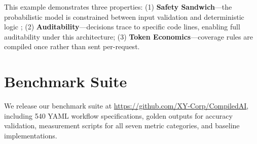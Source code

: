 \documentclass[11pt]{article}
\begin{document}
This example demonstrates three properties: (1) \textbf{Safety Sandwich}---the probabilistic model is constrained between input validation and deterministic logic \citep{dalrymple2024guaranteed}; (2) \textbf{Auditability}---decisions trace to specific code lines, enabling full auditability under this architecture; (3) \textbf{Token Economics}---coverage rules are compiled once rather than sent per-request.

\section{Benchmark Suite}
\label{app:benchmark}

We release our benchmark suite at \url{https://github.com/XY-Corp/CompiledAI}, including 540 YAML workflow specifications, golden outputs for accuracy validation, measurement scripts for all seven metric categories, and baseline implementations.
\end{document}
